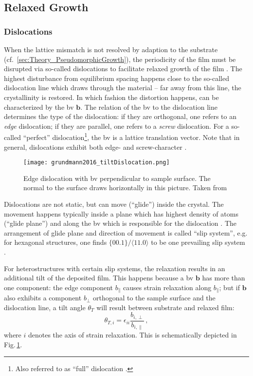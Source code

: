 \subsection{Relaxed Growth}
\label{Sec:Theory_Relaxed}
\subsubsection{Dislocations}
When the lattice mismatch is not resolved by adaption to the substrate (cf.~\ref{sec:Theory_PseudomorphicGrowth}), the periodicity of the film must be disrupted via so-called dislocations to facilitate relaxed growth of the film
    \cite{kneiss2021}.
The highest disturbance from equilibrium spacing happens close to the so-called dislocation line which draws through the material --
far away from this line, the crystallinity is restored.
In which fashion the distortion happens, can be characterized by the \gls{bv} $\mathbf{b}$.
The relation of the \gls{bv} to the dislocation line determines the type of the dislocation:
    if they are orthogonal, one refers to an \emph{edge} dislocation;
    if they are parallel, one refers to a \emph{screw} dislocation.
For a so-called \enquote{perfect} dislocation\footnote{
    Also referred to as \enquote{full} dislocation \cite{grundmann2016}.
}, the \gls{bv} is a lattice translation vector.
Note that in general, dislocations exhibit both edge- and screw-character
    \cite{hull2011}.

    \begin{figure}
        \centering
        \texttt{[image: grundmann2016\_tiltDislocation.png]}
        \caption{Edge dislocation with \gls{bv} perpendicular to sample surface. The normal to the surface draws horizontally in this picture. Taken from \textcite{grundmann2016} \tbd}
        \label{fig:Theory_tiltDislocation}
    \end{figure}

Dislocations are not static, but can move (\enquote{glide}) inside the crystal.
The movement happens typically inside a plane which has highest density of atoms (\enquote{glide plane}) and along the \gls{bv} which is responsible for the dislocation
    \cite{hull2011}.
The arrangement of glide plane and direction of movement is called \enquote{slip system}, e.g. for hexagonal structures, one finds $\{00.1\}/\langle11.0\rangle$ to be one prevailing slip system
    \cite{hull2011}.

For heterostructures with certain slip systems, the relaxation results in an additional tilt of the deposited film.
This happens because a \gls{bv} $\textbf{b}$ has more than one component:
the edge component $b_\parallel$ causes strain relaxation along $b_\parallel$;
but if $\mathbf{b}$ also exhibits a component $b_\perp$ orthogonal to the sample surface and the dislocation line, a tilt angle $\theta_T$ will result between substrate and relaxed film:
\begin{equation}\label{equ:Theory_tiltDislocation}
    \theta_{T,i}=\epsilon_{ii}\frac{b_{i,\perp}}{b_{i,\parallel}}\,,
\end{equation}
where $i$ denotes the axis of strain relaxation.
This is schematically depicted in Fig.\,\ref{fig:Theory_tiltDislocation}.

